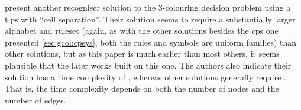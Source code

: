 
\citeauthor{Wang2009} \cite{Wang2009} present another recogniser solution to the 3-colouring decision problem using a \gls{tlps} with \enquote{cell separation}.  Their solution seems to require a substantially larger alphabet and \gls{ruleset} (again, as with the other solutions besides the \gls{cps} one presented \cref{sec:gcol:cpsys}, both the rules and symbols are uniform families) than other solutions, but as this paper is much earlier than most others, it seems plausible that the later works built on this one.  The authors also indicate their solution has a time complexity of , whereas other solutions generally require .  That is, the time complexity depends on both the number of nodes and the number of edges.


